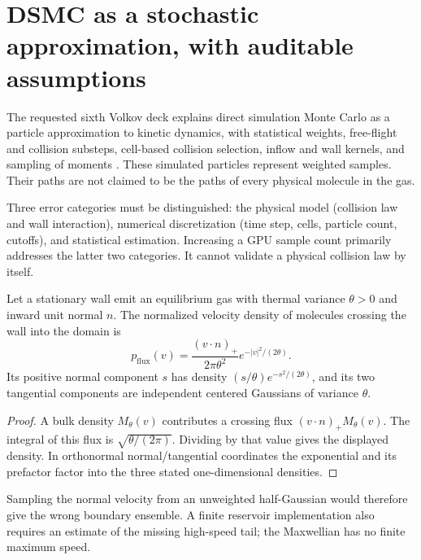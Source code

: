 \section{DSMC as a stochastic approximation, with auditable assumptions}

The requested sixth Volkov deck explains direct simulation Monte Carlo
as a particle approximation to kinetic dynamics, with statistical
weights, free-flight and collision substeps, cell-based collision
selection, inflow and wall kernels, and sampling of moments
\citep{microVolkov06}.  These simulated particles represent weighted
samples.  Their paths are not claimed to be the paths of every physical
molecule in the gas.

Three error categories must be distinguished: the physical model
(collision law and wall interaction), numerical discretization
(time step, cells, particle count, cutoffs), and statistical estimation.
Increasing a GPU sample count primarily addresses the latter two
categories.  It cannot validate a physical collision law by itself.

\begin{proposition}
\label{prop:micro-flux}
Let a stationary wall emit an equilibrium gas with thermal variance
$\theta>0$ and inward unit normal $n$.  The normalized velocity
density of molecules crossing the wall into the domain is
\[
 p_{\mathrm{flux}}(v)
 =\frac{(v\cdot n)_+}{2\pi\theta^2}
       e^{-|v|^2/(2\theta)}.
\]
Its positive normal component $s$ has density
$(s/\theta)e^{-s^2/(2\theta)}$, and its two tangential
components are independent centered Gaussians of variance $\theta$.
\end{proposition}
\begin{proof}
A bulk density $M_\theta(v)$ contributes a crossing flux
$(v\cdot n)_+M_\theta(v)$.  The integral of this flux is
$\sqrt{\theta/(2\pi)}$.  Dividing by that value gives the
displayed density.  In orthonormal normal/tangential coordinates
the exponential and its prefactor factor into the three stated
one-dimensional densities.
\end{proof}

Sampling the normal velocity from an unweighted half-Gaussian would
therefore give the wrong boundary ensemble.  A finite reservoir
implementation also requires an estimate of the missing high-speed
tail; the Maxwellian has no finite maximum speed.

